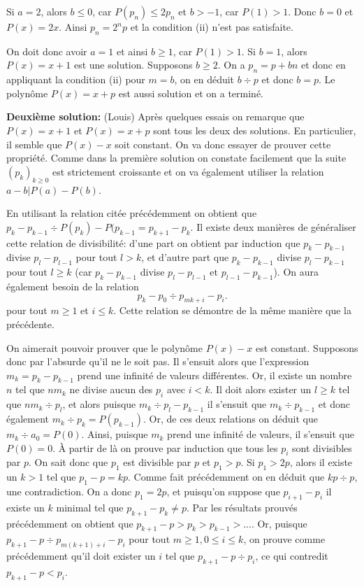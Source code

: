 Si $a=2$, alors $b\leq 0$, car $P(p_n)\leq 2p_n$ et $b>-1$, car $P(1)>1$. Donc $b=0$ et $P(x)=2x$. Ainsi $p_n=2^np$ et la condition (ii) n'est pas satisfaite.

On doit donc avoir $a=1$ et ainsi $b\geq 1$, car $P(1)>1$. Si $b=1$, alors $P(x)=x+1$ est une solution. Supposons $b\geq 2$. On a $p_n=p+bn$ et donc en appliquant la condition (ii) pour $m=b$, on en déduit $b\div p$ et donc $b=p$. Le polynôme $P(x)=x+p$ est aussi solution et on a terminé.

\newpage
\textbf{Deuxième solution:} (Louis)
Après quelques essais on remarque que $P(x) = x+1$ et $P(x) = x+p$ sont tous les deux des solutions. En particulier, il semble que $P(x) - x$ soit constant. On va donc essayer de prouver cette propriété.
Comme dans la première solution on constate facilement que la suite $(p_k)_{k\geq 0}$ est strictement croissante et on va également utiliser la relation $a-b | P(a) - P(b)$.

En utilisant la relation citée précédemment on obtient que $p_k - p_{k-1} \div P(p_k) - P(p_{k-1} = p_{k+1}- p_k$. Il existe deux manières de généraliser cette relation de divisibilité: d'une part on obtient par induction que $p_k - p_{k-1}$ divise $p_l - p_{l-1}$ pour tout $l > k$, et d'autre part que $p_k - p_{k-1}$ divise $p_l - p_{k-1}$ pour tout $l \geq k$ (car $p_k - p_{k-1}$ divise $p_l - p_{l-1}$ et $p_{l-1}- p_{k-1}$). On aura également besoin de la relation
\[
    p_k-p_0 \div p_{mk+i}- p_i.
\]
pour tout $m \geq 1$ et $i\leq k$. Cette relation se démontre de la même manière que la précédente.

On aimerait pouvoir prouver que le polynôme $P(x) - x$ est constant. Supposons donc par l'absurde qu'il ne le soit pas. Il s'ensuit alors que l'expression $m_k = p_k - p_{k-1}$ prend une infinité de valeurs différentes. Or, il existe un nombre $n$ tel que $nm_k$ ne divise aucun des $p_i$ avec $i < k$. Il doit alors exister un $l \geq k$ tel que $nm_k \div p_l$, et alors puisque $m_k \div p_l - p_{k-1}$ il s'ensuit que $m_k \div p_{k-1}$ et donc également $m_k \div p_k = P(p_{k-1})$. Or, de ces deux relations on déduit que $m_k \div a_0 = P(0)$. Ainsi, puisque $m_k$ prend une infinité de valeurs, il s'ensuit que $P(0) = 0$. À partir de là on prouve par induction que tous les $p_i$ sont divisibles par $p$. On sait donc que $p_1$ est divisible par $p$ et $p_1 > p$. Si $p_1 > 2p$, alors il existe un $k > 1$ tel que $p_1 - p = kp$. Comme fait précédemment on en déduit que $kp \div p$, une contradiction. On a donc $p_1 = 2p$, et puisqu'on suppose que $p_{i+1}-p_i$ il existe un $k$ minimal tel que $p_{k+1}-p_k \neq p$. Par les résultats prouvés précédemment on obtient que $p_{k+1} - p > p_k > p_{k-1} > ...$. Or, puisque $p_{k+1} - p \div p_{m(k+1) + i} - p_i$ pour tout $m \geq 1, 0 \leq i \leq k$, on prouve comme précédemment qu'il doit exister un $i$ tel que $p_{k+1}-p \div p_i$, ce qui contredit $p_{k+1}-p < p_i$.

